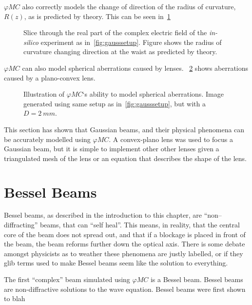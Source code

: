 $\varphi MC$ also correctly models the change of direction of the radius of curvature, $R(z)$, as is predicted by theory.
This can be seen in~\cref{fig:proofchgrz}

\begin{figure}[!ht]
    \centering
    \caption{Slice through the real part of the complex electric field of the \textit{in-silico} experiment as in~\cref{fig:gausssetup}. Figure shows the radius of curvature changing direction at the waist as predicted by theory.}
    \label{fig:proofchgrz}
\end{figure}

$\varphi MC$ can also model spherical aberrations caused by lenses.
~\cref{fig:spheraberr} shows aberrations caused by a plano-convex lens.

\begin{figure}[!ht]
    \centering
    \caption{Illustration of $\varphi MC$`s ability to model spherical aberrations. Image generated using same setup as in~\cref{fig:gausssetup}, but with a $D=2~mm$.}
    \label{fig:spheraberr}
\end{figure}


This section has shown that Gaussian beams, and their physical phenomena can be accurately modelled using $\varphi MC$.
A convex-plano lens was used to focus a Gaussian beam, but it is simple to implement other other lenses given a triangulated mesh of the lens or an equation that describes the shape of the lens. 

\section{Bessel Beams}

Bessel beams, as described in the introduction to this chapter, are ``non--diffracting'' beams, that can ``self heal''.
This means, in reality, that the central core of the beam does not spread out, and that if a blockage is placed in front of the beam, the beam reforms further down the optical axis.
There is some debate amongst physicists as to weather these phenomena are justly labelled, or if they glib terms used to make Bessel beams seem like the solution to everything.

The first ``complex'' beam simulated using $\varphi MC$ is a Bessel beam. 
Bessel beams are non-diffractive solutions to the wave equation. 
Bessel beams were first shown to blah


